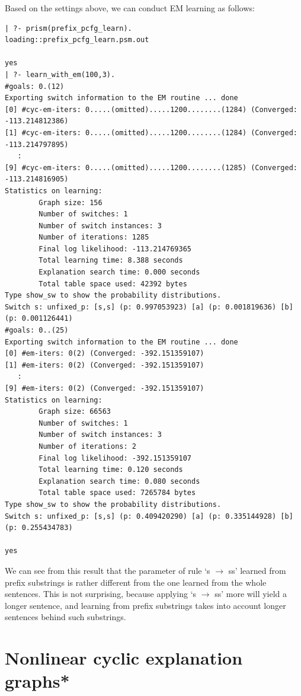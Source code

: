 \documentclass[a4paper]{report}
\begin{document}
Based on the settings above, we can conduct EM learning as follows:
%
\begin{small}
\begin{verbatim}
| ?- prism(prefix_pcfg_learn).
loading::prefix_pcfg_learn.psm.out

yes
| ?- learn_with_em(100,3).
#goals: 0.(12)
Exporting switch information to the EM routine ... done
[0] #cyc-em-iters: 0.....(omitted).....1200........(1284) (Converged: -113.214812386)
[1] #cyc-em-iters: 0.....(omitted).....1200........(1284) (Converged: -113.214797895)
   :
[9] #cyc-em-iters: 0.....(omitted).....1200........(1285) (Converged: -113.214816905)
Statistics on learning:
        Graph size: 156
        Number of switches: 1
        Number of switch instances: 3
        Number of iterations: 1285
        Final log likelihood: -113.214769365
        Total learning time: 8.388 seconds
        Explanation search time: 0.000 seconds
        Total table space used: 42392 bytes
Type show_sw to show the probability distributions.
Switch s: unfixed_p: [s,s] (p: 0.997053923) [a] (p: 0.001819636) [b] (p: 0.001126441)
#goals: 0..(25)
Exporting switch information to the EM routine ... done
[0] #em-iters: 0(2) (Converged: -392.151359107)
[1] #em-iters: 0(2) (Converged: -392.151359107)
   :
[9] #em-iters: 0(2) (Converged: -392.151359107)
Statistics on learning:
        Graph size: 66563
        Number of switches: 1
        Number of switch instances: 3
        Number of iterations: 2
        Final log likelihood: -392.151359107
        Total learning time: 0.120 seconds
        Explanation search time: 0.080 seconds
        Total table space used: 7265784 bytes
Type show_sw to show the probability distributions.
Switch s: unfixed_p: [s,s] (p: 0.409420290) [a] (p: 0.335144928) [b] (p: 0.255434783)

yes
\end{verbatim}
\end{small}
%
\noindent
We can see from this result that the parameter of rule `s $\to$ ss' learned
from prefix substrings is rather different from the one learned from
the whole sentences.  This is not surprising, because applying `s $\to$ ss'
more will yield a longer sentence, and learning from prefix substrings
takes into account longer sentences behind such substrings.


\section{Nonlinear cyclic explanation graphs*}
\label{sec:example:nonlin}
\end{document}
